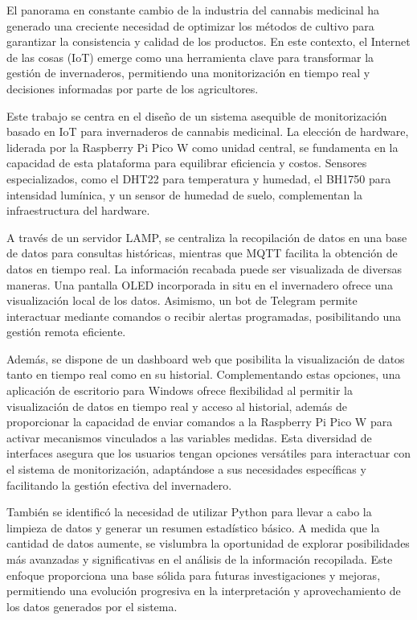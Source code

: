 
El panorama en constante cambio de la industria del cannabis medicinal ha generado una creciente necesidad de optimizar los métodos de cultivo para garantizar la consistencia y calidad de los productos. En este contexto, el Internet de las cosas (IoT) emerge como una herramienta clave para transformar la gestión de invernaderos, permitiendo una monitorización en tiempo real y decisiones informadas por parte de los agricultores.

Este trabajo se centra en el diseño de un sistema asequible de monitorización basado en IoT para invernaderos de cannabis medicinal. La elección de hardware, liderada por la Raspberry Pi Pico W como unidad central, se fundamenta en la capacidad de esta plataforma para equilibrar eficiencia y costos. Sensores especializados, como el DHT22 para temperatura y humedad, el BH1750 para intensidad lumínica, y un sensor de humedad de suelo, complementan la infraestructura del hardware.

A través de un servidor LAMP, se centraliza la recopilación de datos en una base de datos para consultas históricas, mientras que MQTT facilita la obtención de datos en tiempo real. La información recabada puede ser visualizada de diversas maneras. Una pantalla OLED incorporada in situ en el invernadero ofrece una visualización local de los datos. Asimismo, un bot de Telegram permite interactuar mediante comandos o recibir alertas programadas, posibilitando una gestión remota eficiente.

Además, se dispone de un dashboard web que posibilita la visualización de datos tanto en tiempo real como en su historial. Complementando estas opciones, una aplicación de escritorio para Windows ofrece flexibilidad al permitir la visualización de datos en tiempo real y acceso al historial, además de proporcionar la capacidad de enviar comandos a la Raspberry Pi Pico W para activar mecanismos vinculados a las variables medidas. Esta diversidad de interfaces asegura que los usuarios tengan opciones versátiles para interactuar con el sistema de monitorización, adaptándose a sus necesidades específicas y facilitando la gestión efectiva del invernadero.

También se identificó la necesidad de utilizar Python para llevar a cabo la limpieza de datos y generar un resumen estadístico básico. A medida que la cantidad de datos aumente, se vislumbra la oportunidad de explorar posibilidades más avanzadas y significativas en el análisis de la información recopilada. Este enfoque proporciona una base sólida para futuras investigaciones y mejoras, permitiendo una evolución progresiva en la interpretación y aprovechamiento de los datos generados por el sistema.

